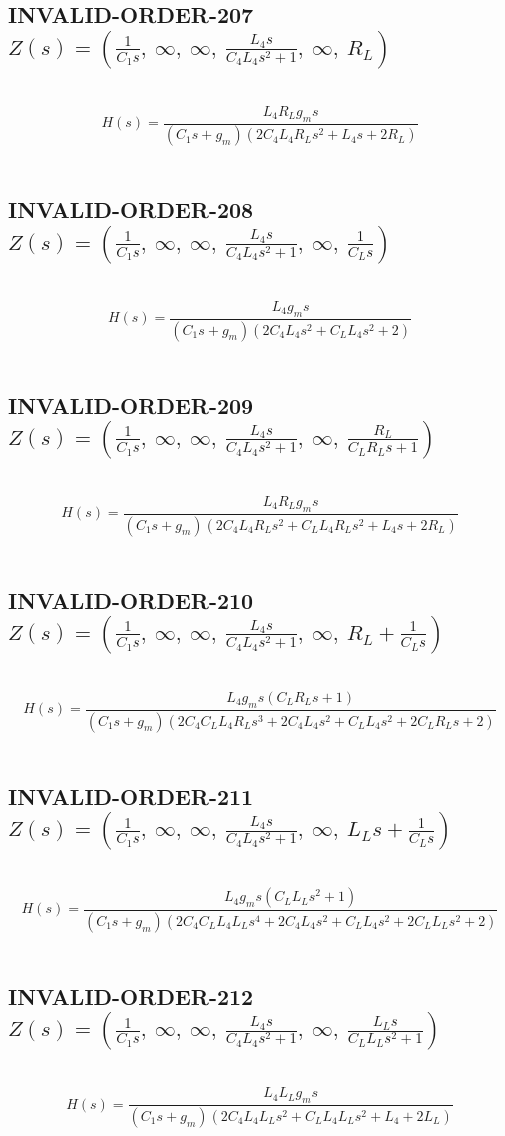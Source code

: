 \documentclass{article}
\begin{document}
\subsection{INVALID-ORDER-207 $Z(s) = \left( \frac{1}{C_{1} s}, \  \infty, \  \infty, \  \frac{L_{4} s}{C_{4} L_{4} s^{2} + 1}, \  \infty, \  R_{L}\right)$ } \ 
\textbf{\[H(s) = \frac{L_{4} R_{L} g_{m} s}{\left(C_{1} s + g_{m}\right) \left(2 C_{4} L_{4} R_{L} s^{2} + L_{4} s + 2 R_{L}\right)}\] } \ 
\subsection{INVALID-ORDER-208 $Z(s) = \left( \frac{1}{C_{1} s}, \  \infty, \  \infty, \  \frac{L_{4} s}{C_{4} L_{4} s^{2} + 1}, \  \infty, \  \frac{1}{C_{L} s}\right)$ } \ 
\textbf{\[H(s) = \frac{L_{4} g_{m} s}{\left(C_{1} s + g_{m}\right) \left(2 C_{4} L_{4} s^{2} + C_{L} L_{4} s^{2} + 2\right)}\] } \ 
\subsection{INVALID-ORDER-209 $Z(s) = \left( \frac{1}{C_{1} s}, \  \infty, \  \infty, \  \frac{L_{4} s}{C_{4} L_{4} s^{2} + 1}, \  \infty, \  \frac{R_{L}}{C_{L} R_{L} s + 1}\right)$ } \ 
\textbf{\[H(s) = \frac{L_{4} R_{L} g_{m} s}{\left(C_{1} s + g_{m}\right) \left(2 C_{4} L_{4} R_{L} s^{2} + C_{L} L_{4} R_{L} s^{2} + L_{4} s + 2 R_{L}\right)}\] } \ 
\subsection{INVALID-ORDER-210 $Z(s) = \left( \frac{1}{C_{1} s}, \  \infty, \  \infty, \  \frac{L_{4} s}{C_{4} L_{4} s^{2} + 1}, \  \infty, \  R_{L} + \frac{1}{C_{L} s}\right)$ } \ 
\textbf{\[H(s) = \frac{L_{4} g_{m} s \left(C_{L} R_{L} s + 1\right)}{\left(C_{1} s + g_{m}\right) \left(2 C_{4} C_{L} L_{4} R_{L} s^{3} + 2 C_{4} L_{4} s^{2} + C_{L} L_{4} s^{2} + 2 C_{L} R_{L} s + 2\right)}\] } \ 
\subsection{INVALID-ORDER-211 $Z(s) = \left( \frac{1}{C_{1} s}, \  \infty, \  \infty, \  \frac{L_{4} s}{C_{4} L_{4} s^{2} + 1}, \  \infty, \  L_{L} s + \frac{1}{C_{L} s}\right)$ } \ 
\textbf{\[H(s) = \frac{L_{4} g_{m} s \left(C_{L} L_{L} s^{2} + 1\right)}{\left(C_{1} s + g_{m}\right) \left(2 C_{4} C_{L} L_{4} L_{L} s^{4} + 2 C_{4} L_{4} s^{2} + C_{L} L_{4} s^{2} + 2 C_{L} L_{L} s^{2} + 2\right)}\] } \ 
\subsection{INVALID-ORDER-212 $Z(s) = \left( \frac{1}{C_{1} s}, \  \infty, \  \infty, \  \frac{L_{4} s}{C_{4} L_{4} s^{2} + 1}, \  \infty, \  \frac{L_{L} s}{C_{L} L_{L} s^{2} + 1}\right)$ } \ 
\textbf{\[H(s) = \frac{L_{4} L_{L} g_{m} s}{\left(C_{1} s + g_{m}\right) \left(2 C_{4} L_{4} L_{L} s^{2} + C_{L} L_{4} L_{L} s^{2} + L_{4} + 2 L_{L}\right)}\] } \ 
\end{document}
